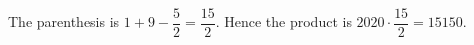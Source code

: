 The parenthesis is $1+9-\dfrac{5}{2}=\dfrac{15}{2}$. Hence the product is $2020\cdot\dfrac{15}{2}=\boxed{15150}$.
